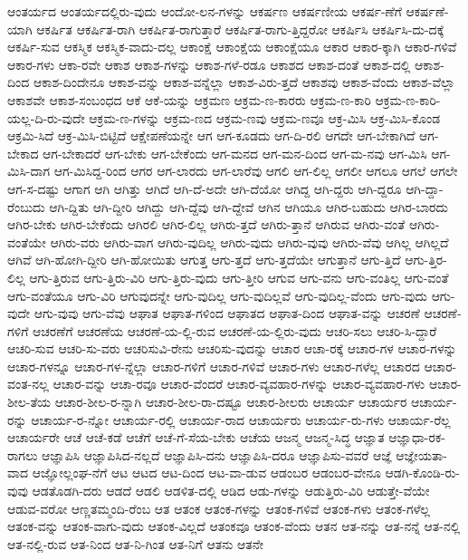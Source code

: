 {ಆಂತರ್ಯದ
ಆಂತರ್ಯದಲ್ಲಿರು-ವುದು
ಆಂದೋ-ಲನ-ಗಳನ್ನು
ಆಕರ್ಷಣ
ಆಕರ್ಷಣೀಯ
ಆಕರ್ಷ-ಣೆಗೆ
ಆಕರ್ಷಣೆ-ಯಾಗಿ
ಆಕರ್ಷಿತ
ಆಕರ್ಷಿತ-ರಾಗಿ
ಆಕರ್ಷಿತ-ರಾಗುತ್ತಾರೆ
ಆಕರ್ಷಿತ-ರಾಗು-ತ್ತಿದ್ದರೋ
ಆಕರ್ಷಿಸಿ
ಆಕರ್ಷಿಸಿ-ದು-ದಕ್ಕೆ
ಆಕರ್ಷಿ-ಸುವ
ಆಕಸ್ಮಿಕ
ಆಕಸ್ಮಿಕ-ವಾದು-ದಲ್ಲ
ಆಕಾಂಕ್ಷೆ
ಆಕಾಂಕ್ಷೆಯ
ಆಕಾಂಕ್ಷೆಯೂ
ಆಕಾರ
ಆಕಾರ-ಕ್ಕಾಗಿ
ಆಕಾರ-ಗಳಿವೆ
ಆಕಾರ-ಗಳು
ಆಕಾ-ರವೇ
ಆಕಾಶ
ಆಕಾಶ-ಗಳನ್ನು
ಆಕಾಶ-ಗಳೆ-ರಡೂ
ಆಕಾಶದ
ಆಕಾಶ-ದಂತೆ
ಆಕಾಶ-ದಲ್ಲಿ
ಆಕಾಶ-ದಿಂದ
ಆಕಾಶ-ದಿಂದೇನೂ
ಆಕಾಶ-ವನ್ನು
ಆಕಾಶ-ವನ್ನೆಲ್ಲಾ
ಆಕಾಶ-ವಿರು-ತ್ತದೆ
ಆಕಾಶವು
ಆಕಾಶ-ವೆಂದು
ಆಕಾಶ-ವೆಲ್ಲಾ
ಆಕಾಶವೇ
ಆಕಾಶ-ಸಂಬಂಧದ
ಆಕೆ
ಆಕೆ-ಯನ್ನು
ಆಕ್ರಮಣ
ಆಕ್ರಮ-ಣ-ಕಾರರು
ಆಕ್ರಮ-ಣ-ಕಾರಿ
ಆಕ್ರಮ-ಣ-ಕಾರಿ-ಯಲ್ಲ-ದಿ-ರು-ವುದೇ
ಆಕ್ರಮ-ಣ-ಗಳನ್ನು
ಆಕ್ರಮ-ಣದ
ಆಕ್ರಮ-ಣವು
ಆಕ್ರಮ-ಣವೂ
ಆಕ್ರ-ಮಿಸಿ
ಆಕ್ರ-ಮಿಸಿ-ಕೊಂಡ
ಆಕ್ರಮಿ-ಸಿದೆ
ಆಕ್ರ-ಮಿಸಿ-ಬಿಟ್ಟಿದೆ
ಆಕ್ಷೇಪಣೆಯನ್ನೇ
ಆಗ
ಆಗ-ಕೂಡದು
ಆಗ-ದಿ-ರಲಿ
ಆಗದೇ
ಆಗ-ಬೇಕಾಗಿದೆ
ಆಗ-ಬೇಕಾದ
ಆಗ-ಬೇಕಾದರೆ
ಆಗ-ಬೇಕು
ಆಗ-ಬೇಕೆಂದು
ಆಗ-ಮನದ
ಆಗ-ಮನ-ದಿಂದ
ಆಗ-ಮ-ನವು
ಆಗ-ಮಿಸಿ
ಆಗ-ಮಿಸಿ-ದಾಗ
ಆಗ-ಮಿಸಿದ್ದ-ರಿಂದ
ಆಗರ
ಆಗ-ಲಾರದು
ಆಗ-ಲಾರೆವು
ಆಗಲಿ
ಆಗ-ಲಿಲ್ಲ
ಆಗಲೀ
ಆಗಲೂ
ಆಗಲೆ
ಆಗಲೇ
ಆಗ-ಸ-ದಷ್ಟು
ಆಗಾಗ
ಆಗಿ
ಆಗಿತ್ತು
ಆಗಿದೆ
ಆಗಿ-ದೆ-ಅದೇ
ಆಗಿ-ದೆಯೋ
ಆಗಿದ್ದ
ಆಗಿ-ದ್ದರು
ಆಗಿ-ದ್ದರೂ
ಆಗಿ-ದ್ದಾ-ರೆಂಬುದು
ಆಗಿ-ದ್ದಿತು
ಆಗಿ-ದ್ದೀರಿ
ಆಗಿದ್ದು
ಆಗಿ-ದ್ದೆವು
ಆಗಿ-ದ್ದೇವೆ
ಆಗಿನ
ಆಗಿಯೂ
ಆಗಿರ-ಬಹುದು
ಆಗಿರ-ಬಾರದು
ಆಗಿರ-ಬೇಕು
ಆಗಿರ-ಬೇಕೆಂದು
ಆಗಿರಲಿ
ಆಗಿರ-ಲಿಲ್ಲ
ಆಗಿರು-ತ್ತದೆ
ಆಗಿರು-ತ್ತಾನೆ
ಆಗಿರುವ
ಆಗಿರು-ವಂತೆ
ಆಗಿರು-ವಂತೆಯೇ
ಆಗಿರು-ವರು
ಆಗಿರು-ವಾಗ
ಆಗಿರು-ವುದಿಲ್ಲ
ಆಗಿರು-ವುದು
ಆಗಿರು-ವುವು
ಆಗಿರು-ವೆವು
ಆಗಿಲ್ಲ
ಆಗಿಲ್ಲದೆ
ಆಗಿವೆ
ಆಗಿ-ಹೋಗಿ-ದ್ದೀರಿ
ಆಗಿ-ಹೋಯಿತು
ಆಗುತ್ತ
ಆಗು-ತ್ತದೆ
ಆಗು-ತ್ತದೆಯೇ
ಆಗುತ್ತಾನೆ
ಆಗು-ತ್ತಿದೆ
ಆಗು-ತ್ತಿರ-ಲಿಲ್ಲ
ಆಗು-ತ್ತಿರುವ
ಆಗು-ತ್ತಿರು-ವಿರಿ
ಆಗು-ತ್ತಿರು-ವುದು
ಆಗು-ತ್ತೀರಿ
ಆಗುವ
ಆಗು-ವನು
ಆಗು-ವಂತಿಲ್ಲ
ಆಗು-ವಂತೆ
ಆಗು-ವಂತೆಯೂ
ಆಗು-ವಿರಿ
ಆಗುವುದನ್ನೇ
ಆಗು-ವುದಿಲ್ಲ
ಆಗು-ವುದಿಲ್ಲವೆ
ಆಗು-ವುದಿಲ್ಲ-ವೆಂದು
ಆಗು-ವುದು
ಆಗು-ವುದೇ
ಆಗು-ವುವು
ಆಗು-ವೆವು
ಆಘಾತ
ಆಘಾತ-ಗಳಿಂದ
ಆಘಾತದ
ಆಘಾತ-ದಿಂದ
ಆಘಾತ-ವನ್ನು
ಆಚರಣೆ
ಆಚರಣೆ-ಗಳಿಗೆ
ಆಚರಣೆಗೆ
ಆಚರಣೆಯ
ಆಚರಣೆ-ಯ-ಲ್ಲಿ-ರುವ
ಆಚರಣೆ-ಯ-ಲ್ಲಿರು-ವುದು
ಆಚರಿ-ಸಲು
ಆಚರಿ-ಸಿ-ದ್ದಾರೆ
ಆಚರಿ-ಸುವ
ಆಚರಿ-ಸು-ವರು
ಆಚರಿಸುವಿ-ರೇನು
ಆಚರಿಸು-ವುದನ್ನು
ಆಚಾರ
ಆಚಾ-ರಕ್ಕೆ
ಆಚಾರ-ಗಳ
ಆಚಾರ-ಗಳನ್ನು
ಆಚಾರ-ಗಳನ್ನೂ
ಆಚಾರ-ಗಳ-ನ್ನೆಲ್ಲಾ
ಆಚಾರ-ಗಳಿಗೆ
ಆಚಾರ-ಗಳಿವೆ
ಆಚಾರ-ಗಳು
ಆಚಾರ-ಗಳೆಲ್ಲ
ಆಚಾರದ
ಆಚಾರ-ವಂತ-ನಲ್ಲ
ಆಚಾರ-ವನ್ನು
ಆಚಾ-ರವೂ
ಆಚಾರ-ವೆಂದರೆ
ಆಚಾರ-ವ್ಯವಹಾರ-ಗಳನ್ನು
ಆಚಾರ-ವ್ಯವಹಾರ-ಗಳು
ಆಚಾರ-ಶೀಲ-ತೆಯ
ಆಚಾರ-ಶೀಲ-ರ-ನ್ನಾಗಿ
ಆಚಾರ-ಶೀಲ-ರಾ-ದಷ್ಟೂ
ಆಚಾರ-ಶೀಲರು
ಆಚಾರ್ಯ
ಆಚಾರ್ಯರ
ಆಚಾರ್ಯ-ರನ್ನು
ಆಚಾರ್ಯ-ರ-ನ್ನೋ
ಆಚಾರ್ಯ-ರಲ್ಲಿ
ಆಚಾರ್ಯ-ರಾದ
ಆಚಾರ್ಯರು
ಆಚಾರ್ಯ-ರು-ಗಳು
ಆಚಾರ್ಯ-ರೆಲ್ಲ
ಆಚಾರ್ಯರೇ
ಆಚೆ
ಆಚೆ-ಕಡೆ
ಆಚೆಗೆ
ಆಚೆ-ಗೆ-ಸೆಯ-ಬೇಕು
ಆಚೆಯ
ಆಜನ್ಮ
ಆಜನ್ಮ-ಸಿದ್ಧ
ಆಜ್ಞಾತ
ಆಜ್ಞಾಧಾ-ರಕ-ರಾಗಲು
ಆಜ್ಞಾಪಿಸಿ
ಆಜ್ಞಾಪಿಸಿದ-ನಲ್ಲದೆ
ಆಜ್ಞಾಪಿಸಿ-ದನು
ಆಜ್ಞಾಪಿಸಿ-ದರೂ
ಆಜ್ಞಾಪಿಸು-ವವರೆ
ಆಜ್ಞೆ
ಆಜ್ಞೇಯತಾ-ವಾದ
ಆಜ್ಞೋಲ್ಲಂಘ-ನೆಗೆ
ಆಟ
ಆಟದ
ಆಟ-ದಿಂದ
ಆಟ-ವಾ-ಡುವ
ಆಡಂಬರ
ಆಡಂಬರ-ವೇನೂ
ಆಡಗಿ-ಕೊಂಡಿ-ರು-ವುವು
ಆಡತೊಡಗಿ-ದರು
ಆಡದೆ
ಆಡಲಿ
ಆಡಳಿತ-ದಲ್ಲಿ
ಆಡಿದ
ಆಡು-ಗಳನ್ನು
ಆಡುತ್ತಿರು-ವಿರಿ
ಆಡುತ್ತೇ-ವೆಯೇ
ಆಡುವ-ವರೋ
ಆಣ್ಣತಮ್ಮಂದಿ-ರೆಂಬ
ಆತ
ಆತಂಕ
ಆತಂಕ-ಗಳನ್ನು
ಆತಂಕ-ಗಳಿವೆ
ಆತಂಕ-ಗಳು
ಆತಂಕ-ಗಳೆಲ್ಲ
ಆತಂಕ-ವನ್ನು
ಆತಂಕ-ವಾಗು-ವುದು
ಆತಂಕ-ವಿಲ್ಲದೆ
ಆತಂಕವೂ
ಆತಂಕ-ವೆಂದು
ಆತನ
ಆತ-ನನ್ನು
ಆತ-ನನ್ನೆ
ಆತ-ನಲ್ಲಿ
ಆತ-ನಲ್ಲಿ-ರುವ
ಆತ-ನಿಂದ
ಆತ-ನಿ-ಗಿಂತ
ಆತ-ನಿಗೆ
ಆತನು
ಆತನೇ
}

